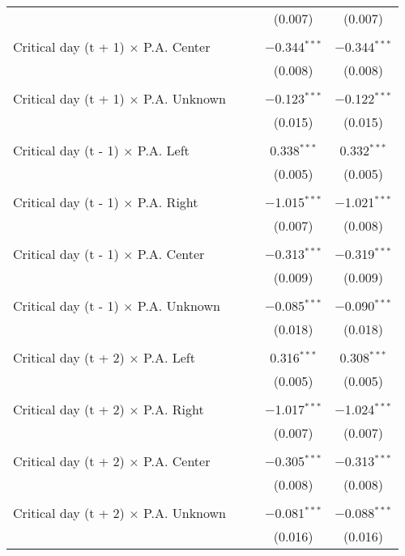 \documentclass[
]{article}
\begin{document}
\begin{table}[!htbp]
{\begin{tabular}{@{\extracolsep{5pt}}lcccc}
  &  &  & (0.007) & (0.007) \\ 
  & & & & \\ 
 Critical day (t + 1) $\times$ P.A. Center &  &  & $-$0.344$^{***}$ & $-$0.344$^{***}$ \\ 
  &  &  & (0.008) & (0.008) \\ 
  & & & & \\ 
 Critical day (t + 1) $\times$ P.A. Unknown &  &  & $-$0.123$^{***}$ & $-$0.122$^{***}$ \\ 
  &  &  & (0.015) & (0.015) \\ 
  & & & & \\ 
 Critical day (t - 1) $\times$ P.A. Left &  &  & 0.338$^{***}$ & 0.332$^{***}$ \\ 
  &  &  & (0.005) & (0.005) \\ 
  & & & & \\ 
 Critical day (t - 1) $\times$ P.A. Right &  &  & $-$1.015$^{***}$ & $-$1.021$^{***}$ \\ 
  &  &  & (0.007) & (0.008) \\ 
  & & & & \\ 
 Critical day (t - 1) $\times$ P.A. Center &  &  & $-$0.313$^{***}$ & $-$0.319$^{***}$ \\ 
  &  &  & (0.009) & (0.009) \\ 
  & & & & \\ 
 Critical day (t - 1) $\times$ P.A. Unknown &  &  & $-$0.085$^{***}$ & $-$0.090$^{***}$ \\ 
  &  &  & (0.018) & (0.018) \\ 
  & & & & \\ 
 Critical day (t + 2) $\times$ P.A. Left &  &  & 0.316$^{***}$ & 0.308$^{***}$ \\ 
  &  &  & (0.005) & (0.005) \\ 
  & & & & \\ 
 Critical day (t + 2) $\times$ P.A. Right &  &  & $-$1.017$^{***}$ & $-$1.024$^{***}$ \\ 
  &  &  & (0.007) & (0.007) \\ 
  & & & & \\ 
 Critical day (t + 2) $\times$ P.A. Center &  &  & $-$0.305$^{***}$ & $-$0.313$^{***}$ \\ 
  &  &  & (0.008) & (0.008) \\ 
  & & & & \\ 
 Critical day (t + 2) $\times$ P.A. Unknown &  &  & $-$0.081$^{***}$ & $-$0.088$^{***}$ \\ 
  &  &  & (0.016) & (0.016) \\ 

\end{tabular}}
\end{table}
\end{document}
